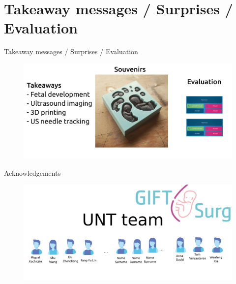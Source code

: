 \section{Takeaway messages / Surprises / Evaluation}



{
\begin{frame}{Takeaway messages / Surprises / Evaluation}
  \begin{figure}
  \centering
  \includegraphics[width=1.0\textwidth]{./figures/takeaways/versions/drawing-v00}
  \end{figure}

\end{frame}
}


{
\begin{frame}{Acknowledgements}

  \begin{figure}
  \centering
  \includegraphics[width=1.0\textwidth]{./figures/team/versions/drawing-v02.png}
  \end{figure}

\end{frame}
}
